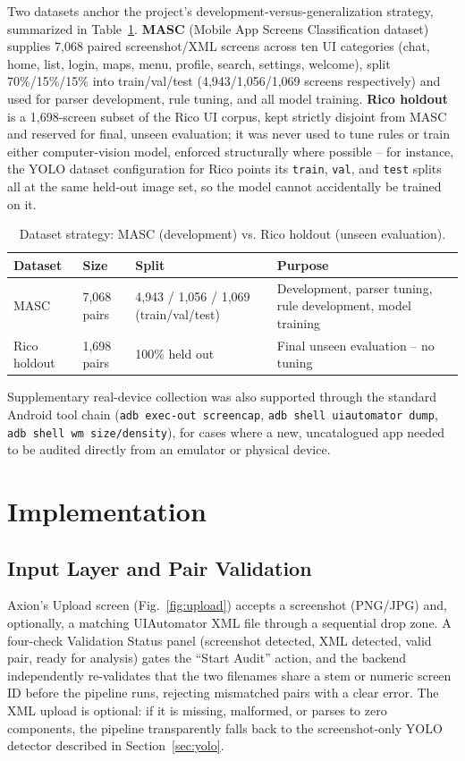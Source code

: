 \documentclass[10pt,conference]{IEEEtran}
\begin{document}
Two datasets anchor the project's development-versus-generalization strategy, summarized in Table~\ref{tab:datasets}. \textbf{MASC} (Mobile App Screens Classification dataset)~\cite{masc-kaggle} supplies 7{,}068 paired screenshot/XML screens across ten UI categories (chat, home, list, login, maps, menu, profile, search, settings, welcome), split 70\%/15\%/15\% into train/val/test (4{,}943/1{,}056/1{,}069 screens respectively) and used for parser development, rule tuning, and all model training. \textbf{Rico holdout}~\cite{rico,rico-kaggle} is a 1{,}698-screen subset of the Rico UI corpus, kept strictly disjoint from MASC and reserved for final, unseen evaluation; it was never used to tune rules or train either computer-vision model, enforced structurally where possible -- for instance, the YOLO dataset configuration for Rico points its \texttt{train}, \texttt{val}, and \texttt{test} splits all at the same held-out image set, so the model cannot accidentally be trained on it.

\begin{table}[!t]
\caption{Dataset strategy: MASC (development) vs. Rico holdout (unseen evaluation).}
\label{tab:datasets}
\centering
\scriptsize
\begin{tabular}{@{}p{1.3cm}p{1.0cm}p{2.2cm}p{2.1cm}@{}}
\toprule
\textbf{Dataset} & \textbf{Size} & \textbf{Split} & \textbf{Purpose} \\
\midrule
MASC & 7{,}068 pairs & 4{,}943 / 1{,}056 / 1{,}069 (train/val/test) & Development, parser tuning, rule development, model training \\
Rico holdout & 1{,}698 pairs & 100\% held out & Final unseen evaluation -- no tuning \\
\bottomrule
\end{tabular}
\end{table}

Supplementary real-device collection was also supported through the standard Android tool chain (\texttt{adb exec-out screencap}, \texttt{adb shell uiautomator dump}, \texttt{adb shell wm size/density}), for cases where a new, uncatalogued app needed to be audited directly from an emulator or physical device.

\section{Implementation}

\subsection{Input Layer and Pair Validation}
Axion's Upload screen (Fig.~\ref{fig:upload}) accepts a screenshot (PNG/JPG) and, optionally, a matching UIAutomator XML file through a sequential drop zone. A four-check Validation Status panel (screenshot detected, XML detected, valid pair, ready for analysis) gates the ``Start Audit'' action, and the backend independently re-validates that the two filenames share a stem or numeric screen ID before the pipeline runs, rejecting mismatched pairs with a clear error. The XML upload is optional: if it is missing, malformed, or parses to zero components, the pipeline transparently falls back to the screenshot-only YOLO detector described in Section~\ref{sec:yolo}.
\end{document}
